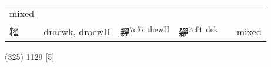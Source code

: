 \documentclass[14pt,a4paper]{scrartcl}
\begin{document}
\begin{longtable}[c]{@{}llllll@{}}
\begin{minipage}[t]{0.14\columnwidth}\raggedright\strut
mixed
\strut\end{minipage}\tabularnewline
\begin{minipage}[t]{0.14\columnwidth}\raggedright\strut
䊮
\strut\end{minipage} &
\begin{minipage}[t]{0.14\columnwidth}\raggedright\strut
draewk, draewH
\strut\end{minipage} &
\begin{minipage}[t]{0.14\columnwidth}\raggedright\strut
糶\textsuperscript{7cf6~thewH}
\strut\end{minipage} &
\begin{minipage}[t]{0.14\columnwidth}\raggedright\strut
糴\textsuperscript{7cf4~dek}
\strut\end{minipage} &
\begin{minipage}[t]{0.14\columnwidth}\raggedright\strut
\strut\end{minipage} &
\begin{minipage}[t]{0.14\columnwidth}\raggedright\strut
mixed
\strut\end{minipage}\tabularnewline
\bottomrule
\end{longtable}

(325) 1129 {[}5{]}
\end{document}
